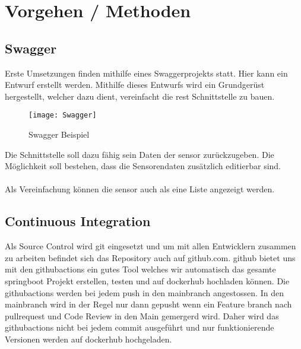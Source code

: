 \documentclass[../main.tex]{subfiles}
\begin{document}
	\section{Vorgehen / Methoden}
	
	\subsection{Swagger}
	Erste Umsetzungen finden mithilfe eines Swaggerprojekts statt. Hier kann ein Entwurf erstellt werden. Mithilfe dieses Entwurfs wird ein Grundgerüst hergestellt, welcher dazu dient, vereinfacht die \gls{rest} Schnittstelle zu bauen.
	
	\begin{figure}[H]
		\centering
		\texttt{[image: Swagger]}
		\caption{Swagger Beispiel}
		\label{fig:Swagger}
	\end{figure}
	\par
	\noindent
	Die Schnittstelle soll dazu fähig sein Daten der \gls{sensor} zurückzugeben. Die Möglichkeit soll bestehen, dass die Sensorendaten zusätzlich editierbar sind.\\
	\\
	Als Vereinfachung können die \gls{sensor} auch als eine Liste angezeigt werden.
	
	\subsection{Continuous Integration}
	Als Source Control wird \gls{git} eingesetzt und um mit allen Entwicklern zusammen zu arbeiten befindet sich das Repository auch auf github.com. \gls{github} bietet uns mit den \gls{githubactions} ein gutes Tool welches wir automatisch das gesamte \gls{springboot} Projekt erstellen, testen und auf \gls{dockerhub} hochladen können. Die \gls{githubactions} werden bei jedem \gls{push} in den \gls{mainbranch} angestossen. In den \gls{mainbranch} wird in der Regel nur dann gepusht wenn ein Feature \gls{branch} nach \gls{pullrequest} und Code Review in den Main gemergerd wird. Daher wird das \gls{githubactions} nicht bei jedem \gls{commit} ausgeführt und nur funktionierende Versionen werden auf \gls{dockerhub} hochgeladen.
	
\end{document}
